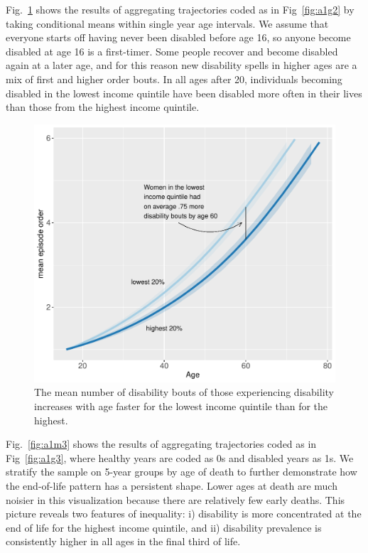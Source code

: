 \documentclass[a4paper,left=1.25cm,right=1.25cm,top=1.25cm,bottom=1.25cm]{article}
\begin{document}
Fig.~\ref{fig:a1m2} shows the results of aggregating trajectories coded as in Fig~\ref{fig:a1g2} by taking conditional means within single year age intervals. We assume that everyone starts off having never been disabled before age 16, so anyone become disabled at age 16 is a first-timer. Some people recover and become disabled again at a later age, and for this reason new disability spells in higher ages are a mix of first and higher order bouts. In all ages after 20, individuals becoming disabled in the lowest income quintile have been disabled more often in their lives than those from the highest income quintile.
\begin{figure}
    \centering
    \includegraphics[scale=.6]{Figures/App1_macro2.pdf}
    \caption{The mean number of disability bouts of those experiencing disability increases with age faster for the lowest income quintile than for the highest.}
    \label{fig:a1m2}
\end{figure}

Fig.~\ref{fig:a1m3} shows the results of aggregating trajectories coded as in Fig~\ref{fig:a1g3}, where healthy years are coded as 0s and disabled years as 1s. We stratify the sample on 5-year groups by age of death to further demonstrate how the end-of-life pattern has a persistent shape. Lower ages at death are much noisier in this visualization because there are relatively few early deaths. This picture reveals two features of inequality: i) disability is more concentrated at the end of life for the highest income quintile, and ii) disability prevalence is consistently higher in all ages in the final third of life.
\end{document}
